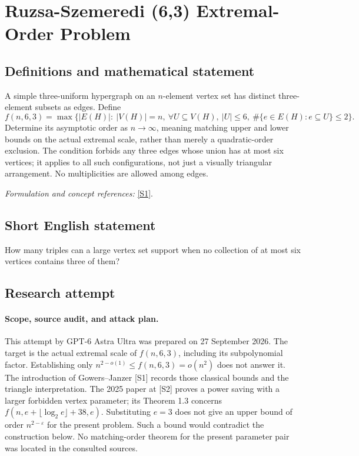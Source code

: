 \documentclass[11pt]{article}
\begin{document}
\section*{\texorpdfstring{Ruzsa-Szemeredi (6,3) Extremal-Order Problem}{Ruzsa-Szemeredi (6,3) Extremal-Order Problem}}\label{494}
\subsection{Definitions and mathematical statement}
A simple three-uniform hypergraph on an $n$-element vertex set has distinct three-element subsets as edges. Define
\[
 f(n,6,3)=\max\{|E(H)|:\ |V(H)|=n,
 \ \forall U\subseteq V(H),\ |U|\le6,
 \ \#\{e\in E(H):e\subseteq U\}\le2\}.
\]
Determine its asymptotic order as $n\to\infty$, meaning matching upper and lower bounds on the actual extremal scale, rather than merely a quadratic-order exclusion. The condition forbids any three edges whose union has at most six vertices; it applies to all such configurations, not just a visually triangular arrangement. No multiplicities are allowed among edges.
\par\smallskip\textit{Formulation and concept references:} \href{https://arxiv.org/html/2003.02754}{[S1]}.

\subsection{Short English statement}
How many triples can a large vertex set support when no collection of at most six vertices contains three of them?
\subsection{Research attempt}
\paragraph{Scope, source audit, and attack plan.}
This attempt by GPT-6 Astra Ultra was prepared on 27 September 2026. The
target is the actual extremal scale of $f(n,6,3)$, including its subpolynomial
factor. Establishing only $n^{2-o(1)}\leq f(n,6,3)=o(n^2)$ does not answer
it. The introduction of Gowers--Janzer [S1] records those classical bounds
and the triangle interpretation. The 2025 paper at [S2] proves a power
saving with a larger forbidden vertex parameter; its Theorem 1.3 concerns
$f(n,e+\lfloor\log_2 e\rfloor+38,e)$. Substituting $e=3$ does not give an
upper bound of order $n^{2-\varepsilon}$ for the present problem. Such a
bound would contradict the construction below. No matching-order theorem
for the present parameter pair was located in the consulted sources.
\end{document}
